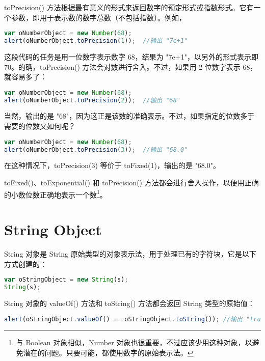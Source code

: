 toPrecision() 方法根据最有意义的形式来返回数字的预定形式或指数形式。它有一个参数，即用于表示数的数字总数（不包括指数）。例如，


\begin{lstlisting}[language=JavaScript]
var oNumberObject = new Number(68);
alert(oNumberObject.toPrecision(1));  //输出 "7e+1"
\end{lstlisting}

这段代码的任务是用一位数字表示数字 68，结果为 "7e+1"，以另外的形式表示即 70。的确，toPrecision() 方法会对数进行舍入。不过，如果用 2 位数字表示 68，就容易多了：



\begin{lstlisting}[language=JavaScript]
var oNumberObject = new Number(68);
alert(oNumberObject.toPrecision(2));  //输出 "68"
\end{lstlisting}

当然，输出的是 "68"，因为这正是该数的准确表示。不过，如果指定的位数多于需要的位数又如何呢？

\begin{lstlisting}[language=JavaScript]
var oNumberObject = new Number(68);
alert(oNumberObject.toPrecision(3));  //输出 "68.0"
\end{lstlisting}

在这种情况下，toPrecision(3) 等价于 toFixed(1)，输出的是 "68.0"。

toFixed()、toExponential() 和 toPrecision() 方法都会进行舍入操作，以便用正确的小数位数正确地表示一个数\footnote{与 Boolean 对象相似，Number 对象也很重要，不过应该少用这种对象，以避免潜在的问题。只要可能，都使用数字的原始表示法。}。




\section{String Object}

String 对象是 String 原始类型的对象表示法，用于处理已有的字符块，它是以下方式创建的：

\begin{lstlisting}[language=JavaScript]
var oStringObject = new String(s);
String(s);
\end{lstlisting}


String 对象的 valueOf() 方法和 toString() 方法都会返回 String 类型的原始值：


\begin{lstlisting}[language=JavaScript]
alert(oStringObject.valueOf() == oStringObject.toString()); //输出 "true"
\end{lstlisting}




